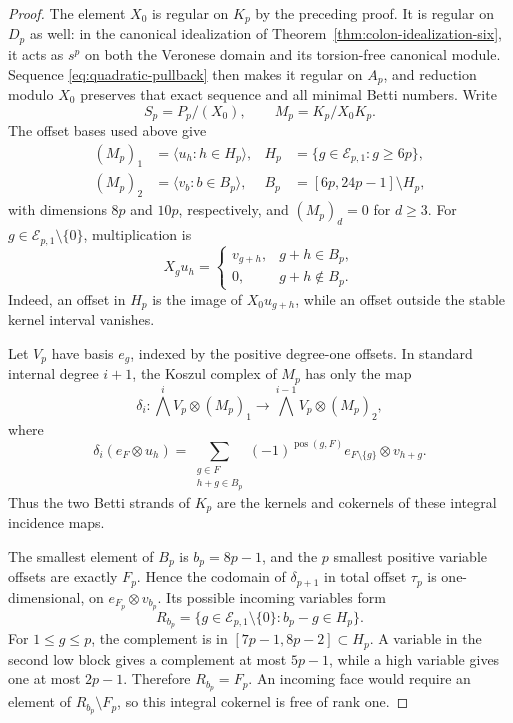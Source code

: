 \documentclass[11pt]{article}
\theoremstyle{definition}
\theoremstyle{remark}
\begin{document}
\begin{proof}
The element \(X_0\) is regular on \(K_p\) by the preceding proof. It is regular on \(D_p\) as
well: in the canonical idealization of Theorem~\ref{thm:colon-idealization-six}, it acts as
\(s^p\) on both the Veronese domain and its torsion-free canonical module. Sequence
\eqref{eq:quadratic-pullback} then makes it regular on \(A_p\), and reduction modulo \(X_0\)
preserves that exact sequence and all minimal Betti numbers. Write
\[
S_p=P_p/(X_0),\qquad M_p=K_p/X_0K_p.
\]
The offset bases used above give
\begin{align*}
(M_p)_1&=\langle u_h:h\in H_p\rangle,
  &H_p&=\{g\in\mathcal E_{p,1}:g\ge6p\},\\
(M_p)_2&=\langle v_b:b\in B_p\rangle,
  &B_p&=[6p,24p-1]\setminus H_p,
\end{align*}
with dimensions \(8p\) and \(10p\), respectively, and \((M_p)_d=0\) for \(d\ge3\). For
\(g\in\mathcal E_{p,1}\setminus\{0\}\), multiplication is
\begin{equation}
X_gu_h=\begin{cases}v_{g+h},&g+h\in B_p,\\0,&g+h\notin B_p.\end{cases}
\label{eq:two-layer-multiplication}
\end{equation}
Indeed, an offset in \(H_p\) is the image of \(X_0u_{g+h}\), while an offset outside the stable
kernel interval vanishes.

Let \(V_p\) have basis \(e_g\), indexed by the positive degree-one offsets. In standard internal
degree \(i+1\), the Koszul complex of \(M_p\) has only the map
\begin{equation}
\delta_i:\bigwedge^iV_p\otimes(M_p)_1
 \longrightarrow\bigwedge^{i-1}V_p\otimes(M_p)_2,
\label{eq:two-layer-incidence}
\end{equation}
where
\[
\delta_i(e_F\otimes u_h)=
\sum_{\substack{g\in F\\h+g\in B_p}}
(-1)^{\operatorname{pos}(g,F)}e_{F\setminus\{g\}}\otimes v_{h+g}.
\]
Thus the two Betti strands of \(K_p\) are the kernels and cokernels of these integral incidence
maps.

The smallest element of \(B_p\) is \(b_p=8p-1\), and the \(p\) smallest positive variable
offsets are exactly \(F_p\). Hence the codomain of \(\delta_{p+1}\) in total offset \(\tau_p\) is
one-dimensional, on \(e_{F_p}\otimes v_{b_p}\). Its possible incoming variables form
\[
R_{b_p}=\{g\in\mathcal E_{p,1}\setminus\{0\}:b_p-g\in H_p\}.
\]
For \(1\le g\le p\), the complement is in \([7p-1,8p-2]\subset H_p\). A variable in the
second low block gives a complement at most \(5p-1\), while a high variable gives one at most
\(2p-1\). Therefore \(R_{b_p}=F_p\). An incoming face would require an element of
\(R_{b_p}\setminus F_p\), so this integral cokernel is free of rank one.


\end{proof}
\end{document}
